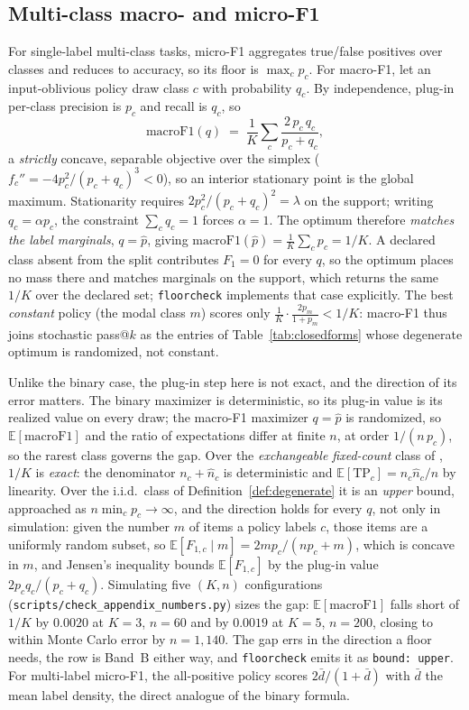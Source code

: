 \documentclass{article}
\theoremstyle{plain}
\theoremstyle{definition}
\newcommand{\floorcheck}{\texttt{floorcheck}}
\begin{document}
\subsection{Multi-class macro- and micro-F1}
\label{app:macrof1}
For single-label multi-class tasks, micro-F1 aggregates true/false positives over classes and reduces to accuracy, so its floor is $\max_c p_c$. For macro-F1, let an input-oblivious policy draw class $c$ with probability $q_c$. By independence, plug-in per-class precision is $p_c$ and recall is $q_c$, so
\begin{equation}
  \mathrm{macroF1}(q) \;=\; \frac{1}{K}\sum_{c} \frac{2\,p_c\,q_c}{p_c + q_c},
\end{equation}
a \emph{strictly} concave, separable objective over the simplex ($f_c'' = -4p_c^2/(p_c+q_c)^3 < 0$), so an interior stationary point is the global maximum. Stationarity requires $2p_c^2/(p_c+q_c)^2 = \lambda$ on the support; writing $q_c = \alpha p_c$, the constraint $\sum_c q_c = 1$ forces $\alpha = 1$. The optimum therefore \emph{matches the label marginals}, $q = \hat{p}$, giving $\mathrm{macroF1}(\hat p) = \frac{1}{K}\sum_c p_c = 1/K$. A declared class absent from the split contributes $F_1 = 0$ for every $q$, so the optimum places no mass there and matches marginals on the support, which returns the same $1/K$ over the declared set; \floorcheck{} implements that case explicitly. The best \emph{constant} policy (the modal class $m$) scores only $\frac{1}{K}\cdot\frac{2p_m}{1+p_m} < 1/K$: macro-F1 thus joins stochastic pass@$k$ as the entries of Table~\ref{tab:closedforms} whose degenerate optimum is randomized, not constant.

Unlike the binary case, the plug-in step here is not exact, and the direction of its error matters. The binary maximizer is deterministic, so its plug-in value is its realized value on every draw; the macro-F1 maximizer $q = \hat p$ is randomized, so $\mathbb{E}[\mathrm{macroF1}]$ and the ratio of expectations differ at finite $n$, at order $1/(n\,p_c)$, so the rarest class governs the gap. Over the \emph{exchangeable fixed-count} class of \citet{vandebijl2022dutchdraw}, $1/K$ is \emph{exact}: the denominator $n_c + \hat{n}_c$ is deterministic and $\mathbb{E}[\mathrm{TP}_c] = n_c\hat{n}_c/n$ by linearity. Over the i.i.d.\ class of Definition~\ref{def:degenerate} it is an \emph{upper} bound, approached as $n\min_c p_c \to \infty$, and the direction holds for every $q$, not only in simulation: given the number $m$ of items a policy labels $c$, those items are a uniformly random subset, so $\mathbb{E}[F_{1,c} \mid m] = 2mp_c/(np_c + m)$, which is concave in $m$, and Jensen's inequality bounds $\mathbb{E}[F_{1,c}]$ by the plug-in value $2p_cq_c/(p_c + q_c)$. Simulating five $(K, n)$ configurations (\texttt{scripts/check\_appendix\_numbers.py}) sizes the gap: $\mathbb{E}[\mathrm{macroF1}]$ falls short of $1/K$ by $0.0020$ at $K = 3$, $n = 60$ and by $0.0019$ at $K = 5$, $n = 200$, closing to within Monte Carlo error by $n = 1{,}140$. The gap errs in the direction a floor needs, the row is Band~B either way, and \floorcheck{} emits it as \texttt{bound: upper}. For multi-label micro-F1, the all-positive policy scores $2\bar{d}/(1+\bar{d})$ with $\bar{d}$ the mean label density, the direct analogue of the binary formula.
\end{document}
